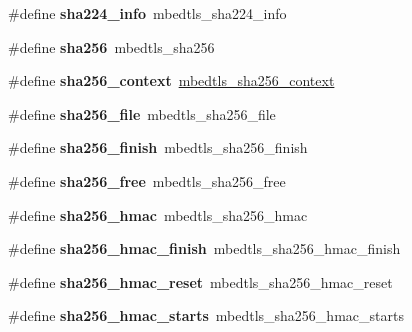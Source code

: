 \begin{DoxyCompactItemize}
\mbox{\label{compat-1_83_8h_a999536a12a55eced021795543f2e1f54}} 
\#define {\bfseries sha224\+\_\+info}~mbedtls\+\_\+sha224\+\_\+info
\item 
\mbox{\label{compat-1_83_8h_a5a3cdc636b5bfdc1617ac9bef8bc1ab9}} 
\#define {\bfseries sha256}~mbedtls\+\_\+sha256
\item 
\mbox{\label{compat-1_83_8h_abab7c4fa81850c9702240cbfbc55a704}} 
\#define {\bfseries sha256\+\_\+context}~\mbox{\hyperlink{structmbedtls__sha256__context}{mbedtls\+\_\+sha256\+\_\+context}}
\item 
\mbox{\label{compat-1_83_8h_a44286a6c131f85b6c7a239be6885f1a5}} 
\#define {\bfseries sha256\+\_\+file}~mbedtls\+\_\+sha256\+\_\+file
\item 
\mbox{\label{compat-1_83_8h_a8a6d430b0d282cdbb0952f8caa4f8c2d}} 
\#define {\bfseries sha256\+\_\+finish}~mbedtls\+\_\+sha256\+\_\+finish
\item 
\mbox{\label{compat-1_83_8h_a54d22b8dff1b2d0407655e26327a7221}} 
\#define {\bfseries sha256\+\_\+free}~mbedtls\+\_\+sha256\+\_\+free
\item 
\mbox{\label{compat-1_83_8h_a54fc1329565ec8991029f4b7e8033580}} 
\#define {\bfseries sha256\+\_\+hmac}~mbedtls\+\_\+sha256\+\_\+hmac
\item 
\mbox{\label{compat-1_83_8h_af1f26ddd60b2c8696cf316ca8fc8462a}} 
\#define {\bfseries sha256\+\_\+hmac\+\_\+finish}~mbedtls\+\_\+sha256\+\_\+hmac\+\_\+finish
\item 
\mbox{\label{compat-1_83_8h_a28edf19ac50a97e64ccbe834544eddaf}} 
\#define {\bfseries sha256\+\_\+hmac\+\_\+reset}~mbedtls\+\_\+sha256\+\_\+hmac\+\_\+reset
\item 
\mbox{\label{compat-1_83_8h_a8f659f8c0434e631604de4de44559984}} 
\#define {\bfseries sha256\+\_\+hmac\+\_\+starts}~mbedtls\+\_\+sha256\+\_\+hmac\+\_\+starts
\item 
\mbox{\label{compat-1_83_8h_a5e89021c26dbeaa49b5e8947e4bd364a}} 

\end{DoxyCompactItemize}
